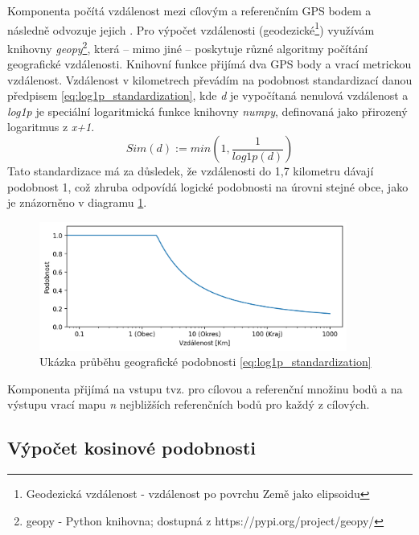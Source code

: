 \documentclass[thesis=M,czech]{FITthesis}[2019/12/23]
\begin{document}
Komponenta počítá vzdálenost mezi cílovým a referenčním GPS bodem a následně odvozuje jejich . Pro výpočet vzdálenosti (geodezické\footnote{Geodezická vzdálenost - vzdálenost po povrchu Země jako elipsoidu}) využívám knihovny \textit{geopy}\footnote{geopy - Python knihovna; dostupná z https://pypi.org/project/geopy/}, která -- mimo jiné -- poskytuje různé algoritmy počítání geografické vzdálenosti. Knihovní funkce přijímá dva GPS body a vrací metrickou vzdálenost. Vzdálenost v kilometrech převádím na podobnost standardizací danou předpisem \ref{eq:log1p_standardization}, kde \textit{d} je vypočítaná nenulová vzdálenost a \textit{log1p} je speciální logaritmická funkce knihovny \textit{numpy}, definovaná jako přirozený logaritmus z \textit{x+1}.
\begin{equation} \label{eq:log1p_standardization}
Sim(d) := min(1, \frac{1}{log1p(d)})
\end{equation}
Tato standardizace má za důsledek, že vzdálenosti do 1,7 kilometru dávají podobnost 1, což zhruba odpovídá logické podobnosti na úrovni stejné obce, jako je znázorněno v diagramu \ref{fig:log1pstandardization}.
\begin{figure}\centering
	\includegraphics[width=0.9\textwidth]{images/log1p_standardization.png}
	\caption{Ukázka průběhu geografické podobnosti \ref{eq:log1p_standardization}}\label{fig:log1pstandardization}
\end{figure}

Komponenta přijímá na vstupu tvz.  pro cílovou a referenční množinu bodů a na výstupu vrací mapu \textit{n} nejbližších referenčních bodů pro každý z cílových.
    
\subsection{Výpočet kosinové podobnosti}
\label{sec:component_cosine_similarity}
\end{document}
